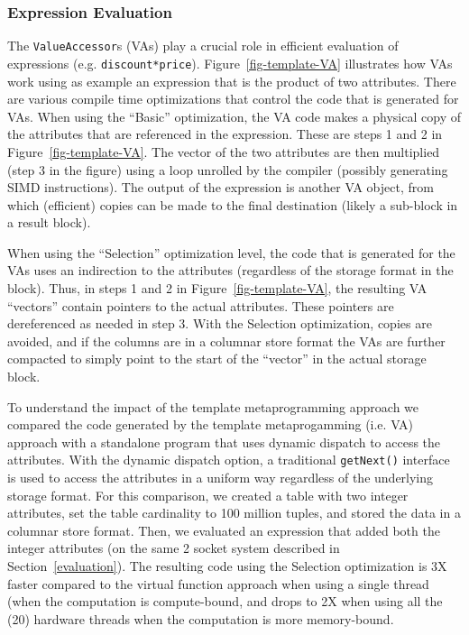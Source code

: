 \subsubsection{Expression Evaluation}\label{ssec:expression-eval}
The \texttt{ValueAccessor}s (VAs) play a crucial role in efficient evaluation of expressions (e.g. \texttt{discount*price}). Figure~\ref{fig-template-VA} illustrates how VAs work using as example an expression that is the product of two attributes. There are  various compile time optimizations that control the code that is generated for VAs. When using the ``Basic'' optimization, the VA code makes a physical copy of the attributes that are referenced in the expression. These are steps 1 and 2 in Figure~\ref{fig-template-VA}. The vector of the two attributes are then multiplied (step 3 in the figure) using a loop unrolled by the compiler (possibly generating SIMD instructions).  The output of the expression is another VA object, from which (efficient) copies can be made to the final destination (likely a sub-block in a result block).

When using the ``Selection'' optimization level, the code that is generated for the VAs uses an indirection to the attributes (regardless of the storage format in the block). Thus, in steps 1 and 2 in Figure~\ref{fig-template-VA}, the resulting VA ``vectors'' contain pointers to the actual attributes. These pointers are dereferenced as needed in step 3. With the Selection optimization, copies are avoided, and if the columns are in a columnar store format the VAs are further compacted to simply point to the start of the ``vector'' in the actual storage block.

To understand the impact of the template metaprogramming  approach we compared the code generated by the template metaprogamming (i.e. VA) approach with a standalone program that uses dynamic dispatch to access the attributes. With the dynamic dispatch option, a traditional \texttt{getNext()} interface is used to access the attributes in a uniform way regardless of the underlying storage format. For this comparison, we created a table with two integer attributes, set the table cardinality to 100 million tuples, and stored the data in a columnar store format. Then, we evaluated an expression that added both the integer attributes (on the same 2 socket system described in Section~\ref{evaluation}). The resulting code using the Selection optimization is 3X faster compared to the virtual function approach when using a single thread (when the computation is compute-bound, and drops to 2X when using all the (20) hardware threads when the computation is more memory-bound.

